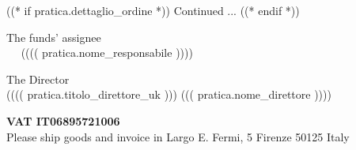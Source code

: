 \documentclass[a4paper,12pt]{letter}
\begin{document}
((* if pratica.dettaglio_ordine *))
\vspace{0.5cm}
\flushright
Continued ...
\newpage
\vspace{2cm}
\quad
((* endif *))

\vspace{1cm}


\begin{minipage}{\textwidth}
\begin{minipage}[t]{8cm}
\begin{center}
The funds' assignee\\
~~ (((( pratica.nome_responsabile )))) ~~ \\
\end{center}
\end{minipage}\hfill\begin{minipage}[t]{8cm}
\begin{center}
The Director \\
({}((( pratica.titolo_direttore_uk ))) ((( pratica.nome_direttore )))) \\
\end{center}
\end{minipage}
\begin{center}
\vspace{14mm}

{\small\bf VAT IT06895721006} \\
{\small Please ship goods and invoice in Largo E. Fermi, 5 Firenze 50125 Italy}
\end{center}
\end{minipage}
\end{document}
